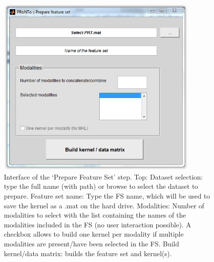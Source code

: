 \begin{figure}[!h]
  \begin{center}
      \includegraphics[height=9cm]{images/prt_ui_feature_set.PNG}
   \caption{Interface of the `Prepare Feature Set' step. Top: Dataset selection: type the full name (with path) or browse to select the dataset to prepare. Feature set name: Type the FS name, which will be used to save the kernel as a .mat on the hard drive. Modalities: Number of modalities to select with the list containing the names of the modalities included in the FS (no user interaction possible). A checkbox allows to build one kernel per modality if multiple modalities are present/have been selected in the FS. Build kernel/data matrix: builds the feature set and kernel(s).}
    \label{fig:FSmainl}
  \end{center}
\end{figure}

